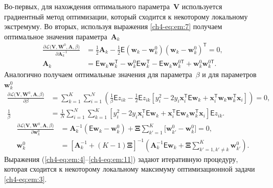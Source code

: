 \documentclass{dissert}
\begin{document}
Во-первых, для нахождения оптимального параметра~$\textbf{V}$ используется градиентный метод оптимизации, который сходится к некоторому локальному экстремуму.
Во вторых, используя выражения \eqref{ch4-eq:em:7} получаем оптимальное значения параметра~$\textbf{A}_{k}$
\[
\label{ch4-eq:em:9}
\begin{aligned}
\frac{\partial \mathcal{L}\bigr(\textbf{V}, \textbf{W}^{0}, \textbf{A}, \beta\bigr)}{\partial \textbf{A}^{-1}_k} &=  \frac{1}{2}\textbf{A}_{k} - \frac{1}{2}\mathsf{E}\left(\textbf{w}_{k} - \textbf{w}_{k}^{0}\right)\left(\textbf{w}_{k} - \textbf{w}_{k}^{0}\right)^{\mathsf{T}} = 0,\\
\textbf{A}_{k} &= \mathsf{E}\textbf{w}_{k}\textbf{w}_{k}^{\mathsf{T}} - \textbf{w}_{k}^{0}\mathsf{E}\textbf{w}_{k}^{\mathsf{T}} - \mathsf{E}\textbf{w}_{k}\textbf{w}_{k}^{0\mathsf{T}} + \textbf{w}_{k}^{0}\textbf{w}_{k}^{0\mathsf{T}}.
\end{aligned}
\]
Аналогично получаем оптимальные значения для параметра~$\beta$ и для параметров~$\textbf{w}_{k}^{0}$
\[
\label{ch4-eq:em:10}
\begin{aligned}
\frac{\partial \mathcal{L}\bigr(\textbf{V}, \textbf{W}^{0}, \textbf{A}, \beta\bigr)}{\partial \beta} &= \sum_{k=1}^{K}\sum_{i=1}^{N}\left(\frac{1}{\beta}\mathsf{E}z_{ik}-\frac{1}{2}\mathsf{E}z_{ik}\left[y_{i}^{2}-2y_{i}\textbf{x}_{i}^{\mathsf{T}}\mathsf{E}\textbf{w}_{k}+\textbf{x}_{i}^{\mathsf{T}}\textbf{w}_{k}\textbf{w}_{k}^{\mathsf{T}}\textbf{x}_{i}\right]\right) = 0,\\
\frac{1}{\beta}&=\frac{1}{N}\sum_{i=1}^{N}\sum_{k=1}^{K}\left[y_{i}^{2}-2y_{i}\textbf{x}_{i}^{\mathsf{T}}\mathsf{E}\textbf{w}_{k} + \textbf{x}_{i}^{\mathsf{T}}\mathsf{E}\textbf{w}_{k}\textbf{w}_{k}^{\mathsf{T}}\textbf{x}_{i}\right]\mathsf{E}z_{ik}.
\end{aligned}
\]
\[
\label{ch4-eq:em:11}
\begin{aligned}
\frac{\partial \mathcal{L}\bigr(\textbf{V}, \textbf{W}^{0}, \textbf{A}, \beta\bigr)}{\partial \mathbf{w}_k^0} &= \mathbf{A}_k^{-1}\left(\mathsf{E}\mathbf{w}_k - \mathbf{w}_{k}^{0}\right) + \bm{\Xi}\sum_{k'=1}^{K}\bigr[\mathbf{w}_{k'}^{0} -\mathbf{w}_{k}^{0}\bigr] = 0,\\
\textbf{w}_{k}^{0} &=\left[\textbf{A}_{k}^{-1}+\left(K-1\right)\bm{\Xi}\right]^{-1}\left(\textbf{A}^{-1}_{k}\mathsf{E}\textbf{w}_{k}+\bm{\Xi}\sum_{k'=1, k'\not=k}^{K}\textbf{w}_{k'}^{0}\right).
\end{aligned}
\]
Выражения (\ref{ch4-eq:em:4}--\ref{ch4-eq:em:11}) задают итеративную процедуру, которая сходится к некоторому локальному максимуму оптимизационной задачи \eqref{ch4-eq:em:3}.
\end{document}
